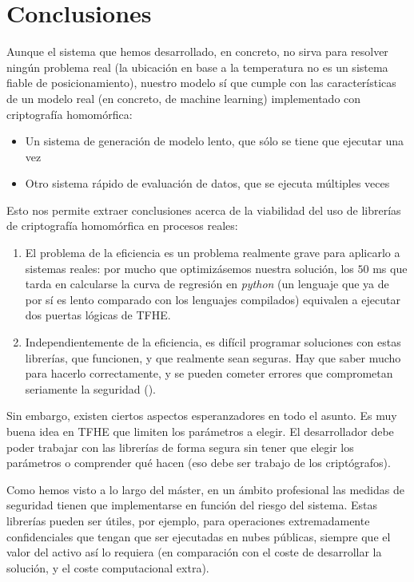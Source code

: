 \chapter{Conclusiones}
\label{chap:conclusiones}

Aunque el sistema que hemos desarrollado, en concreto, no sirva para resolver ningún problema real (la ubicación en base a la temperatura no es un sistema fiable de posicionamiento), nuestro modelo sí que cumple con las características de un modelo real (en concreto, de machine learning) implementado con criptografía homomórfica:

\begin{itemize}
    \item Un sistema de generación de modelo lento, que sólo se tiene que ejecutar una vez
    \item Otro sistema rápido de evaluación de datos, que se ejecuta múltiples veces
\end{itemize}

Esto nos permite extraer conclusiones acerca de la viabilidad del uso de librerías de criptografía homomórfica en procesos reales:

\begin{enumerate}
    \item El problema de la eficiencia es un problema realmente grave para aplicarlo a sistemas reales: por mucho que optimizásemos nuestra solución, los $50$ ms que tarda en calcularse la curva de regresión en \textit{python} (un lenguaje que ya de por sí es lento comparado con los lenguajes compilados) equivalen a ejecutar dos puertas lógicas de TFHE.
    \item Independientemente de la eficiencia, es difícil programar soluciones con estas librerías, que funcionen, y que realmente sean seguras. Hay que saber mucho para hacerlo correctamente, y se pueden cometer errores que comprometan seriamente la seguridad (\cite{peng_danger_2019}).
\end{enumerate}

Sin embargo, existen ciertos aspectos esperanzadores en todo el asunto. Es muy buena idea en TFHE que limiten los parámetros a elegir. El desarrollador debe poder trabajar con las librerías de forma segura sin tener que elegir los parámetros o comprender qué hacen (eso debe ser trabajo de los criptógrafos).

Como hemos visto a lo largo del máster, en un ámbito profesional las medidas de seguridad tienen que implementarse en función del riesgo del sistema. Estas librerías pueden ser útiles, por ejemplo, para operaciones extremadamente confidenciales que tengan que ser ejecutadas en nubes públicas, siempre que el valor del activo así lo requiera (en comparación con el coste de desarrollar la solución, y el coste computacional extra).

